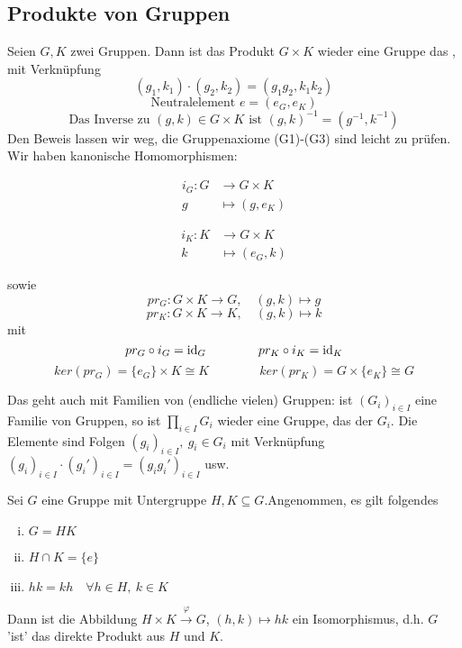 \subsection{Produkte von Gruppen}
\label{sub:produkte}
Seien $G,K$ zwei Gruppen. Dann ist das Produkt $G\times K$ wieder eine Gruppe das , mit Verknüpfung \[(g_1,k_1)\cdot(g_2,k_2)=(g_1g_2,k_1k_2) \]
\[\text{Neutralelement } e=(e_G,e_K) \]
\[\text{Das Inverse zu }(g,k)\in G\times K \text{ ist }(g,k)^{-1}=(g^{-1},k^{-1})\]
Den Beweis lassen wir weg, die Gruppenaxiome (G1)-(G3) sind leicht zu prüfen.\\
Wir haben kanonische Homomorphismen:\\
\begin{minipage}[c]{8cm}
	\begin{equation*}
	\begin{aligned}
		i_G: G &\to G\times K\\
		g &\mapsto (g,e_K)
	\end{aligned}
	\end{equation*}
\end{minipage}
\begin{minipage}[c]{8cm}
	\begin{equation*}
	\begin{aligned}
	i_K: K &\to G\times K\\
	k &\mapsto (e_G,k)
	\end{aligned}
	\end{equation*}
\end{minipage}
sowie \[pr_G:G\times K \to G,\quad (g,k)\mapsto g \]
\[pr_K:G\times K \to K,\quad (g,k)\mapsto k \]
mit \[pr_G\circ i_G=\operatorname{id}_G \qquad\qquad pr_K\circ i_K=\operatorname{id}_K \]
\[ ker(pr_G)=\{e_G\}\times K\cong K \qquad\qquad ker(pr_K)=G\times \{e_K\}\cong G \]

Das geht auch mit Familien von (endliche vielen) Gruppen: ist $(G_i)_{i\in I}$ eine Familie von Gruppen, so ist $\prod\limits_{i\in I}G_i$ wieder eine Gruppe, das  der $G_i$. Die Elemente sind Folgen $(g_i)_{i\in I},~g_i\in G_i$ mit Verknüpfung $(g_i)_{i\in I}\cdot (g_i')_{i\in I}=(g_ig_i')_{i\in I}$ usw.\\
\newpage

Sei $G$ eine Gruppe mit Untergruppe $H,K\subseteq G$.Angenommen, es gilt folgendes
\begin{enumerate}[(i)]
	\item $G=HK$
	\item $H\cap K=\{e\}$
	\item $hk=kh\quad \forall h\in H,~k\in K$
\end{enumerate}
Dann ist die Abbildung $H\times K \stackrel{\varphi}{\to} G$, $(h,k)\mapsto hk$ ein Isomorphismus, d.h. $G$ 'ist' das direkte Produkt aus $H$ und $K$.

